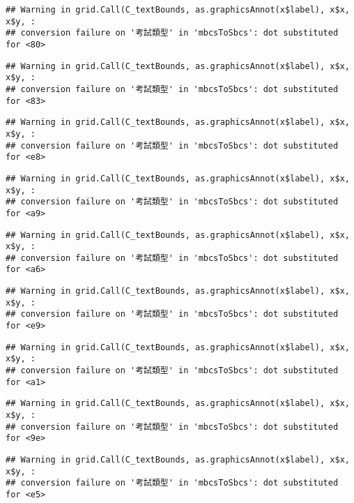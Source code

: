 \documentclass[
]{book}
\begin{document}
\begin{verbatim}
## Warning in grid.Call(C_textBounds, as.graphicsAnnot(x$label), x$x, x$y, :
## conversion failure on '考試類型' in 'mbcsToSbcs': dot substituted for <80>
\end{verbatim}

\begin{verbatim}
## Warning in grid.Call(C_textBounds, as.graphicsAnnot(x$label), x$x, x$y, :
## conversion failure on '考試類型' in 'mbcsToSbcs': dot substituted for <83>
\end{verbatim}

\begin{verbatim}
## Warning in grid.Call(C_textBounds, as.graphicsAnnot(x$label), x$x, x$y, :
## conversion failure on '考試類型' in 'mbcsToSbcs': dot substituted for <e8>
\end{verbatim}

\begin{verbatim}
## Warning in grid.Call(C_textBounds, as.graphicsAnnot(x$label), x$x, x$y, :
## conversion failure on '考試類型' in 'mbcsToSbcs': dot substituted for <a9>
\end{verbatim}

\begin{verbatim}
## Warning in grid.Call(C_textBounds, as.graphicsAnnot(x$label), x$x, x$y, :
## conversion failure on '考試類型' in 'mbcsToSbcs': dot substituted for <a6>
\end{verbatim}

\begin{verbatim}
## Warning in grid.Call(C_textBounds, as.graphicsAnnot(x$label), x$x, x$y, :
## conversion failure on '考試類型' in 'mbcsToSbcs': dot substituted for <e9>
\end{verbatim}

\begin{verbatim}
## Warning in grid.Call(C_textBounds, as.graphicsAnnot(x$label), x$x, x$y, :
## conversion failure on '考試類型' in 'mbcsToSbcs': dot substituted for <a1>
\end{verbatim}

\begin{verbatim}
## Warning in grid.Call(C_textBounds, as.graphicsAnnot(x$label), x$x, x$y, :
## conversion failure on '考試類型' in 'mbcsToSbcs': dot substituted for <9e>
\end{verbatim}

\begin{verbatim}
## Warning in grid.Call(C_textBounds, as.graphicsAnnot(x$label), x$x, x$y, :
## conversion failure on '考試類型' in 'mbcsToSbcs': dot substituted for <e5>
\end{verbatim}
\end{document}
